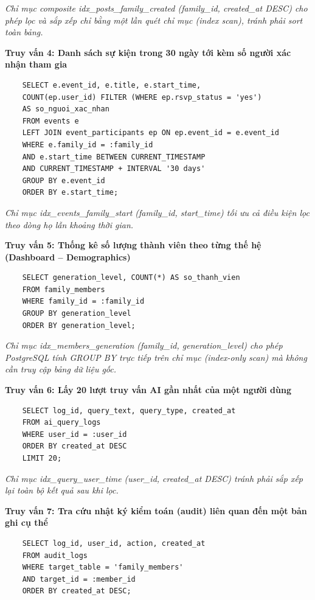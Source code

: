\textit{Chỉ mục composite idx\_posts\_family\_created (family\_id, created\_at DESC) cho phép lọc và sắp xếp chỉ bằng một lần quét chỉ mục (index scan), tránh phải sort toàn bảng.}

\textbf{Truy vấn 4: Danh sách sự kiện trong 30 ngày tới kèm số người xác nhận tham gia}

\begin{lstlisting}
	SELECT e.event_id, e.title, e.start_time,
	COUNT(ep.user_id) FILTER (WHERE ep.rsvp_status = 'yes')
	AS so_nguoi_xac_nhan
	FROM events e
	LEFT JOIN event_participants ep ON ep.event_id = e.event_id
	WHERE e.family_id = :family_id
	AND e.start_time BETWEEN CURRENT_TIMESTAMP
	AND CURRENT_TIMESTAMP + INTERVAL '30 days'
	GROUP BY e.event_id
	ORDER BY e.start_time;
\end{lstlisting}

\textit{Chỉ mục idx\_events\_family\_start (family\_id, start\_time) tối ưu cả điều kiện lọc theo dòng họ lẫn khoảng thời gian.}

\textbf{Truy vấn 5: Thống kê số lượng thành viên theo từng thế hệ (Dashboard -- Demographics)}

\begin{lstlisting}
	SELECT generation_level, COUNT(*) AS so_thanh_vien
	FROM family_members
	WHERE family_id = :family_id
	GROUP BY generation_level
	ORDER BY generation_level;
\end{lstlisting}

\textit{Chỉ mục idx\_members\_generation (family\_id, generation\_level) cho phép PostgreSQL tính GROUP BY trực tiếp trên chỉ mục (index-only scan) mà không cần truy cập bảng dữ liệu gốc.}

\textbf{Truy vấn 6: Lấy 20 lượt truy vấn AI gần nhất của một người dùng}

\begin{lstlisting}
	SELECT log_id, query_text, query_type, created_at
	FROM ai_query_logs
	WHERE user_id = :user_id
	ORDER BY created_at DESC
	LIMIT 20;
\end{lstlisting}

\textit{Chỉ mục idx\_query\_user\_time (user\_id, created\_at DESC) tránh phải sắp xếp lại toàn bộ kết quả sau khi lọc.}

\textbf{Truy vấn 7: Tra cứu nhật ký kiểm toán (audit) liên quan đến một bản ghi cụ thể}

\begin{lstlisting}
	SELECT log_id, user_id, action, created_at
	FROM audit_logs
	WHERE target_table = 'family_members'
	AND target_id = :member_id
	ORDER BY created_at DESC;
\end{lstlisting}

